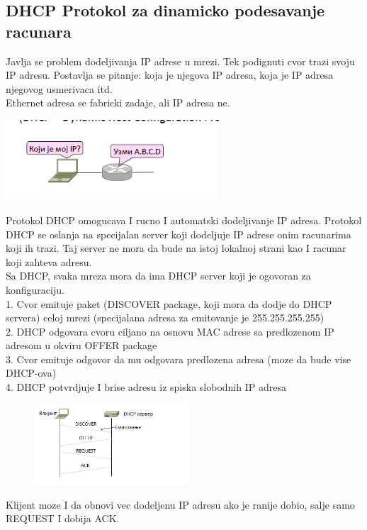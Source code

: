 \documentclass{article} %
\begin{document}
\subsection{DHCP Protokol za dinamicko podesavanje racunara}
Javlja se problem dodeljivanja IP adrese u mrezi. Tek podignuti cvor trazi svoju IP adresu. Postavlja se pitanje: koja je njegova IP adresa, koja je IP adresa njegovog usmerivaca itd.\\
Ethernet adresa se fabricki zadaje, ali IP adresa ne.
 \begin{center}
\includegraphics[width=8cm, height=3cm]{dhcp}\\
\end{center}
Protokol DHCP omogucava I rucno I automatski dodeljivanje IP adresa. Protokol DHCP se oslanja na specijalan server koji dodeljuje IP adrese onim racunarima koji ih trazi. Taj server ne mora da bude na istoj lokalnoj strani kao I racunar koji zahteva adresu. \\
Sa DHCP, svaka mreza mora da ima DHCP server koji je ogovoran za konfiguraciju.\\
1. Cvor emituje paket (DISCOVER package, koji mora da dodje do DHCP servera) celoj mrezi (specijalana adresa za emitovanje je 255.255.255.255) \\
2. DHCP odgovara cvoru ciljano na osnovu MAC adrese sa predlozenom IP adresom u okviru OFFER package\\
3. Cvor emituje odgovor da mu odgovara predlozena adresa (moze da bude vise DHCP-ova)\\
4. DHCP potvrdjuje I brise adresu iz spiska slobodnih IP adresa
 \begin{center}
\includegraphics[width=8cm, height=3cm]{dhcp2}\\
\end{center}
Klijent moze I da obnovi vec dodeljenu IP adresu ako je ranije dobio, salje samo REQUEST I dobija ACK.\\
\end{document}
